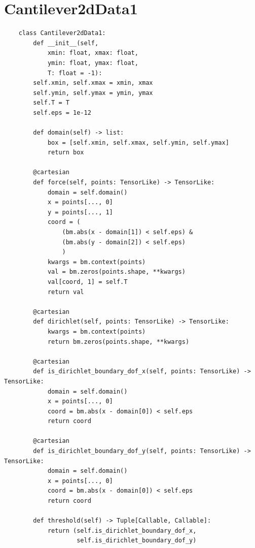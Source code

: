 \documentclass[mathpazo]{cicp}
\begin{document}
\section{Cantilever2dData1}
\label{sec:code_canti_2d}
\begin{lstlisting}
	class Cantilever2dData1:
		def __init__(self, 
			xmin: float, xmax: float, 
			ymin: float, ymax: float,
			T: float = -1):
		self.xmin, self.xmax = xmin, xmax
		self.ymin, self.ymax = ymin, ymax
		self.T = T 
		self.eps = 1e-12
		
		def domain(self) -> list:
			box = [self.xmin, self.xmax, self.ymin, self.ymax]
			return box
		
		@cartesian
		def force(self, points: TensorLike) -> TensorLike:
			domain = self.domain()
			x = points[..., 0]
			y = points[..., 1]
			coord = (
				(bm.abs(x - domain[1]) < self.eps) & 
				(bm.abs(y - domain[2]) < self.eps)
				)
			kwargs = bm.context(points)
			val = bm.zeros(points.shape, **kwargs)
			val[coord, 1] = self.T
			return val
		
		@cartesian
		def dirichlet(self, points: TensorLike) -> TensorLike:
			kwargs = bm.context(points)
			return bm.zeros(points.shape, **kwargs)
		
		@cartesian
		def is_dirichlet_boundary_dof_x(self, points: TensorLike) -> TensorLike:
			domain = self.domain()
			x = points[..., 0]
			coord = bm.abs(x - domain[0]) < self.eps
			return coord
		
		@cartesian
		def is_dirichlet_boundary_dof_y(self, points: TensorLike) -> TensorLike:
			domain = self.domain()
			x = points[..., 0]
			coord = bm.abs(x - domain[0]) < self.eps
			return coord    
		
		def threshold(self) -> Tuple[Callable, Callable]:
			return (self.is_dirichlet_boundary_dof_x, 
					self.is_dirichlet_boundary_dof_y)
\end{lstlisting}
\end{document}
